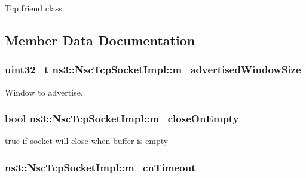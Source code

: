 Tcp friend class. 



\subsection{Member Data Documentation}
\subsubsection[{\texorpdfstring{m\+\_\+advertised\+Window\+Size}{m_advertisedWindowSize}}]{\setlength{\rightskip}{0pt plus 5cm}uint32\+\_\+t ns3\+::\+Nsc\+Tcp\+Socket\+Impl\+::m\+\_\+advertised\+Window\+Size\hspace{0.3cm}{\ttfamily [private]}}\hypertarget{classns3_1_1NscTcpSocketImpl_a186d532dcf757ca6406b310e55bb967c}{}\label{classns3_1_1NscTcpSocketImpl_a186d532dcf757ca6406b310e55bb967c}


Window to advertise. 

\subsubsection[{\texorpdfstring{m\+\_\+close\+On\+Empty}{m_closeOnEmpty}}]{\setlength{\rightskip}{0pt plus 5cm}bool ns3\+::\+Nsc\+Tcp\+Socket\+Impl\+::m\+\_\+close\+On\+Empty\hspace{0.3cm}{\ttfamily [private]}}\hypertarget{classns3_1_1NscTcpSocketImpl_a542de48d71ff4a6b363ef6b74a24312d}{}\label{classns3_1_1NscTcpSocketImpl_a542de48d71ff4a6b363ef6b74a24312d}


true if socket will close when buffer is empty 

\subsubsection[{\texorpdfstring{m\+\_\+cn\+Timeout}{m_cnTimeout}}]{ ns3\+::\+Nsc\+Tcp\+Socket\+Impl\+::m\+\_\+cn\+Timeout\hspace{0.3cm}{\ttfamily [private]}}\hypertarget{classns3_1_1NscTcpSocketImpl_a3574c33a1e889a987c963198d6c119ce}{}\label{classns3_1_1NscTcpSocketImpl_a3574c33a1e889a987c963198d6c119ce}


